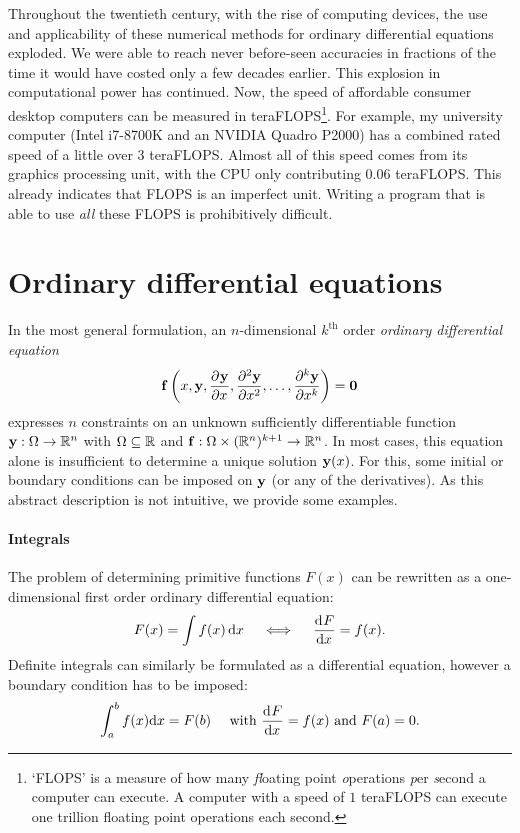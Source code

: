 Throughout the twentieth century, with the rise of computing devices, the use and applicability of these numerical methods for ordinary differential equations exploded. We were able to reach never before-seen accuracies in fractions of the time it would have costed only a few decades earlier. This explosion in computational power has continued. Now, the speed of affordable consumer desktop computers can be measured in teraFLOPS\footnote{`FLOPS' is a measure of how many \emph{fl}oating point \emph{o}perations \emph{p}er \emph{s}econd a computer can execute. A computer with a speed of $1$ teraFLOPS can execute one trillion floating point operations each second.}. For example, my university computer (Intel i7-8700K and an NVIDIA Quadro P2000) has a combined rated speed of a little over 3 teraFLOPS. Almost all of this speed comes from its graphics processing unit, with the CPU only contributing $0.06$ teraFLOPS. This already indicates that FLOPS is an imperfect unit. Writing a program that is able to use \emph{all} these FLOPS is prohibitively difficult.

\section{Ordinary differential equations}

In the most general formulation, an $n$-dimensional $k^\text{th}$ order \emph{ordinary differential equation}
\begin{equation}\label{equ:c1_ode_def}
    \vb{f}\left(x, \vb{y}, {\pdv[]{\vb{y}}{x}}, {\pdv[2]{\vb{y}}{x}}, \dots, {\pdv[k]{\vb{y}}{x}}\right) = \vb{0}
\end{equation}
expresses $n$ constraints on an unknown sufficiently differentiable function $\vb{y} : \Omega \to \mathbb{R}^n$ with $\Omega \subseteq \mathbb{R}$ and $\vb{f}: \Omega \times (\mathbb{R}^n)^{k+1} \to \mathbb{R}^n$. In most cases, this equation alone is insufficient to determine a unique solution $\vb{y}(x)$. For this, some initial or boundary conditions can be imposed on $\vb{y}$ (or any of the derivatives). As this abstract description is not intuitive, we provide some examples.

\paragraph{Integrals} The problem of determining primitive functions $F(x)$ can be rewritten as a one-dimensional first order ordinary differential equation:
$$
    F(x) = \int f(x) \,\dd x \quad \iff \quad \dv[]{F}{x} = f(x)\text{.}
$$
Definite integrals can similarly be formulated as a differential equation, however a boundary condition has to be imposed:
$$
    \int_a^b f(x) \dd x = F(b) \quad \text{ with } \dv[]{F}{x} = f(x) \text{ and } F(a) = 0\text{.}
$$

